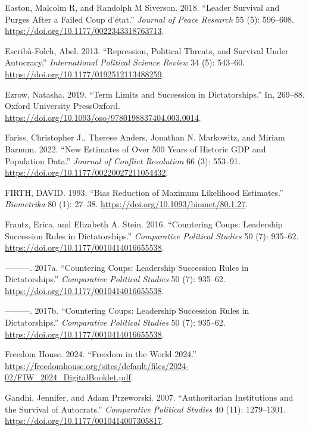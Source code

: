 \documentclass[
  12pt,
]{report}
\newlength{\cslhangindent}
\newenvironment{CSLReferences}[2] %
 {\begin{list}{}{%
  \setlength{\itemindent}{0pt}
  \setlength{\leftmargin}{0pt}
  \setlength{\parsep}{0pt}
  \ifodd #1
   \setlength{\leftmargin}{\cslhangindent}
   \setlength{\itemindent}{-1\cslhangindent}
  \fi
  \setlength{\itemsep}{#2\baselineskip}}}
 {\end{list}}
\begin{document}
\begin{CSLReferences}{1}{0}
Easton, Malcolm R, and Randolph M Siverson. 2018. {``Leader Survival and
Purges After a Failed Coup d{'}état.''} \emph{Journal of Peace Research}
55 (5): 596--608. \url{https://doi.org/10.1177/0022343318763713}.

Escribà-Folch, Abel. 2013. {``Repression, Political Threats, and
Survival Under Autocracy.''} \emph{International Political Science
Review} 34 (5): 543--60. \url{https://doi.org/10.1177/0192512113488259}.

Ezrow, Natasha. 2019. {``Term Limits and Succession in Dictatorships.''}
In, 269--88. Oxford University PressOxford.
\url{https://doi.org/10.1093/oso/9780198837404.003.0014}.

Fariss, Christopher J., Therese Anders, Jonathan N. Markowitz, and
Miriam Barnum. 2022. {``New Estimates of Over 500 Years of Historic GDP
and Population Data.''} \emph{Journal of Conflict Resolution} 66 (3):
553--91. \url{https://doi.org/10.1177/00220027211054432}.

FIRTH, DAVID. 1993. {``Bias Reduction of Maximum Likelihood
Estimates.''} \emph{Biometrika} 80 (1): 27--38.
\url{https://doi.org/10.1093/biomet/80.1.27}.

Frantz, Erica, and Elizabeth A. Stein. 2016. {``Countering Coups:
Leadership Succession Rules in Dictatorships.''} \emph{Comparative
Political Studies} 50 (7): 935--62.
\url{https://doi.org/10.1177/0010414016655538}.

---------. 2017a. {``Countering Coups: Leadership Succession Rules in
Dictatorships.''} \emph{Comparative Political Studies} 50 (7): 935--62.
\url{https://doi.org/10.1177/0010414016655538}.

---------. 2017b. {``Countering Coups: Leadership Succession Rules in
Dictatorships.''} \emph{Comparative Political Studies} 50 (7): 935--62.
\url{https://doi.org/10.1177/0010414016655538}.

Freedom House. 2024. {``Freedom in the World 2024.''}
\url{https://freedomhouse.org/sites/default/files/2024-02/FIW_2024_DigitalBooklet.pdf}.

Gandhi, Jennifer, and Adam Przeworski. 2007. {``Authoritarian
Institutions and the Survival of Autocrats.''} \emph{Comparative
Political Studies} 40 (11): 1279--1301.
\url{https://doi.org/10.1177/0010414007305817}.


\end{CSLReferences}
\end{document}
